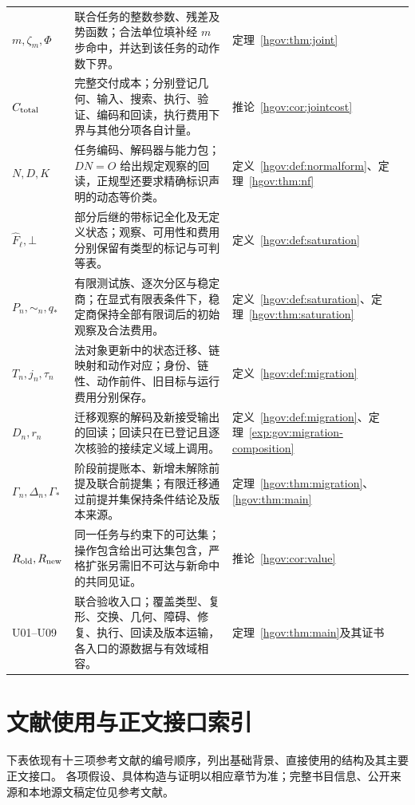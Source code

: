 \documentclass[12pt,a4paper,openany,notitlepage]{report}
\theoremstyle{plain}
\theoremstyle{definition}
\theoremstyle{remark}
\def\mathcal#1{#1}\def\mathsf#1{#1}\def\mathbb#1{#1}%
\begin{document}
\begin{CJK*}{UTF8}{gkai}
\begin{longtable}{P{0.24\textwidth}P{0.54\textwidth}P{0.14\textwidth}}
$m,\zeta_m,\Phi$ & 联合任务的整数参数、残差及势函数；合法单位填补经 $m$ 步命中，并达到该任务的动作数下界。 & 定理~\ref{hgov:thm:joint}\\
$C_{\rm total}$ & 完整交付成本；分别登记几何、输入、搜索、执行、验证、编码和回读，执行费用下界与其他分项各自计量。 & 推论~\ref{hgov:cor:jointcost}\\
$N,D,\mathcal K$ & 任务编码、解码器与能力包；$DN=O$ 给出规定观察的回读，正规型还要求精确标识声明的动态等价类。 & 定义~\ref{hgov:def:normalform}、定理~\ref{hgov:thm:nf}\\
$\widehat F_\ell,\bot$ & 部分后继的带标记全化及无定义状态；观察、可用性和费用分别保留有类型的标记与可判等表。 & 定义~\ref{hgov:def:saturation}\\
$\mathcal P_n,\sim_n,q_*$ & 有限测试族、逐次分区与稳定商；在显式有限表条件下，稳定商保持全部有限词后的初始观察及合法费用。 & 定义~\ref{hgov:def:saturation}、定理~\ref{hgov:thm:saturation}\\
$T_n,j_n,\tau_n$ & 法对象更新中的状态迁移、链映射和动作对应；身份、链性、动作前件、旧目标与运行费用分别保存。 & 定义~\ref{hgov:def:migration}\\
$D_n,r_n$ & 迁移观察的解码及新接受输出的回读；回读只在已登记且逐次核验的接续定义域上调用。 & 定义~\ref{hgov:def:migration}、定理~\ref{exp:gov:migration-composition}\\
$\Gamma_n,\Delta_n,\Gamma_*$ & 阶段前提账本、新增未解除前提及联合前提集；有限迁移通过前提并集保持条件结论及版本来源。 & 定理~\ref{hgov:thm:migration}、\ref{hgov:thm:main}\\
$\mathcal R_{\rm old},\mathcal R_{\rm new}$ & 同一任务与约束下的可达集；操作包含给出可达集包含，严格扩张另需旧不可达与新命中的共同见证。 & 推论~\ref{hgov:cor:value}\\
U01--U09 & 联合验收入口；覆盖类型、复形、交换、几何、障碍、修复、执行、回读及版本运输，各入口的源数据与有效域相容。 & 定理~\ref{hgov:thm:main}及其证书\\
\end{longtable}
\endgroup

\chapter{文献使用与正文接口索引}
\label{app:hgov:coverage}

下表依现有十三项参考文献的编号顺序，列出基础背景、直接使用的结构及其主要正文接口。
各项假设、具体构造与证明以相应章节为准；完整书目信息、公开来源和本地源文稿定位见参考文献。


\end{CJK*}
\end{document}
